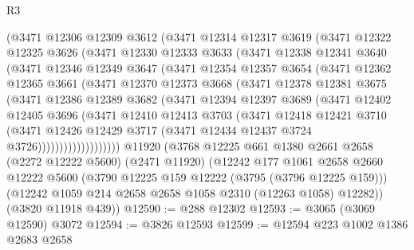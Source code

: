 \begin{lexlean}{R3}
\begin{coremodule}
        (@3471
          @12306
          @12309
          @3612
          (@3471
            @12314
            @12317
            @3619
            (@3471
              @12322
              @12325
              @3626
              (@3471
                @12330
                @12333
                @3633
                (@3471
                  @12338
                  @12341
                  @3640
                  (@3471
                    @12346
                    @12349
                    @3647
                    (@3471
                      @12354
                      @12357
                      @3654
                      (@3471
                        @12362
                        @12365
                        @3661
                        (@3471
                          @12370
                          @12373
                          @3668
                          (@3471
                            @12378
                            @12381
                            @3675
                            (@3471
                              @12386
                              @12389
                              @3682
                              (@3471
                                @12394
                                @12397
                                @3689
                                (@3471
                                  @12402
                                  @12405
                                  @3696
                                  (@3471
                                    @12410
                                    @12413
                                    @3703
                                    (@3471
                                      @12418
                                      @12421
                                      @3710
                                      (@3471
                                        @12426
                                        @12429
                                        @3717
                                        (@3471 @12434 @12437 @3724 @3726)))))))))))))))))))
    @11920
    (@3768
      @12225
      @661
      @1380
      @2661
      @2658
      (@2272 @12222 @5600)
      (@2471 @11920)
      (@12242
        @177
        @1061
        @2658
        @2660
        @12222
        @5600
        (@3790 @12225 @159 @12222 (@3795 (@3796 @12225 @159)))
        (@12242 @1059 @214 @2658 @2658 @1058 @2310 (@12263 @1058) @12282))
      (@3820 @11918 @439))
@12590 := @288 @12302
@12593 := @3065 (@3069 @12590) @3072
@12594 := @3826 @12593
@12599 := @12594 @223 @1002 @1386 @2683 @2658

\end{coremodule}
\end{lexlean}

